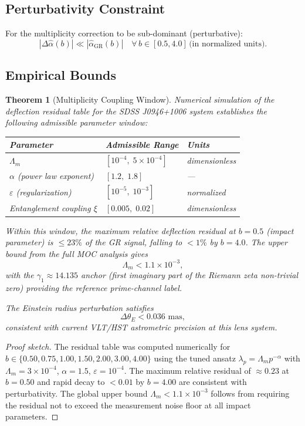 \documentclass[11pt]{amsart}
\newtheorem{theorem}{Theorem}[section]
\begin{document}
\subsection{Perturbativity Constraint}

For the multiplicity correction to be sub-dominant (perturbative):
\[
  |\Delta\hat{\alpha}(b)| \ll |\hat{\alpha}_{\mathrm{GR}}(b)| \quad \forall\, b \in [0.5, 4.0]\,\text{(in normalized units)}.
\]

\subsection{Empirical Bounds}

\begin{theorem}[Multiplicity Coupling Window]\label{thm:Lambda-bounds}
Numerical simulation of the deflection residual table for the SDSS J0946+1006 system establishes the following admissible parameter window:
\begin{center}
\begin{tabular}{lll}
\toprule
Parameter & Admissible Range & Units \\
\midrule
$\Lambda_m$ & $[10^{-4},\; 5\times10^{-4}]$ & dimensionless \\
$\alpha$ (power law exponent) & $[1.2,\; 1.8]$ & — \\
$\varepsilon$ (regularization) & $[10^{-5},\; 10^{-3}]$ & normalized \\
Entanglement coupling $\xi$ & $[0.005,\; 0.02]$ & dimensionless \\
\bottomrule
\end{tabular}
\end{center}
Within this window, the maximum relative deflection residual at $b = 0.5$ (impact parameter) is $\leq 23\%$ of the GR signal, falling to $< 1\%$ by $b = 4.0$. The upper bound from the full MOC analysis gives
\[
  \Lambda_m < 1.1 \times 10^{-3},
\]
with the $\gamma_1 \approx 14.135$ anchor (first imaginary part of the Riemann zeta non-trivial zero) providing the reference prime-channel label.

The Einstein radius perturbation satisfies
\[
  \Delta\theta_E < 0.036 \text{ mas},
\]
consistent with current VLT/HST astrometric precision at this lens system.
\end{theorem}

\begin{proof}[Proof sketch]
The residual table was computed numerically for $b \in \{0.50, 0.75, 1.00, 1.50, 2.00, 3.00, 4.00\}$ using the tuned ansatz $\lambda_p = \Lambda_m p^{-\alpha}$ with $\Lambda_m = 3\times10^{-4}$, $\alpha = 1.5$, $\varepsilon = 10^{-4}$. The maximum relative residual of $\approx 0.23$ at $b = 0.50$ and rapid decay to $< 0.01$ by $b = 4.00$ are consistent with perturbativity. The global upper bound $\Lambda_m < 1.1\times10^{-3}$ follows from requiring the residual not to exceed the measurement noise floor at all impact parameters.
\end{proof}
\end{document}
